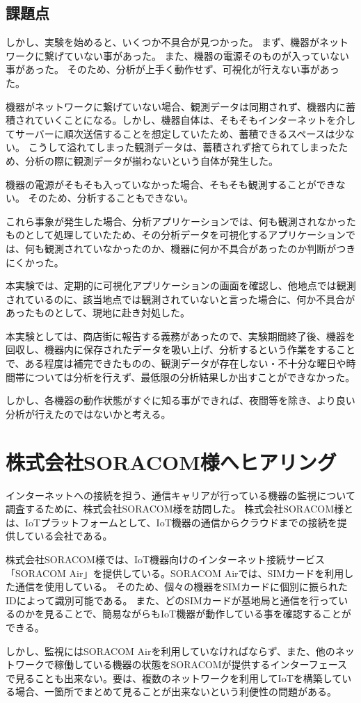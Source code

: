 \subsection{課題点}

しかし、実験を始めると、いくつか不具合が見つかった。
まず、機器がネットワークに繋げていない事があった。
また、機器の電源そのものが入っていない事があった。
そのため、分析が上手く動作せず、可視化が行えない事があった。

機器がネットワークに繋げていない場合、観測データは同期されず、機器内に蓄積されていくことになる。しかし、機器自体は、そもそもインターネットを介してサーバーに順次送信することを想定していたため、蓄積できるスペースは少ない。
こうして溢れてしまった観測データは、蓄積されず捨てられてしまったため、分析の際に観測データが揃わないという自体が発生した。

機器の電源がそもそも入っていなかった場合、そもそも観測することができない。
そのため、分析することもできない。

これら事象が発生した場合、分析アプリケーションでは、何も観測されなかったものとして処理していたため、その分析データを可視化するアプリケーションでは、何も観測されていなかったのか、機器に何か不具合があったのか判断がつきにくかった。

本実験では、定期的に可視化アプリケーションの画面を確認し、他地点では観測されているのに、該当地点では観測されていないと言った場合に、何か不具合があったものとして、現地に赴き対処した。

本実験としては、商店街に報告する義務があったので、実験期間終了後、機器を回収し、機器内に保存されたデータを吸い上げ、分析するという作業をすることで、ある程度は補完できたものの、観測データが存在しない・不十分な曜日や時間帯については分析を行えず、最低限の分析結果しか出すことができなかった。

しかし、各機器の動作状態がすぐに知る事ができれば、夜間等を除き、より良い分析が行えたのではないかと考える。




\section{株式会社SORACOM様へヒアリング}
インターネットへの接続を担う、通信キャリアが行っている機器の監視について調査するために、株式会社SORACOM様を訪問した。
株式会社SORACOM様とは、IoTプラットフォームとして、IoT機器の通信からクラウドまでの接続を提供している会社である。

株式会社SORACOM様では、IoT機器向けのインターネット接続サービス「SORACOM Air」を提供している。SORACOM Airでは、SIMカードを利用した通信を使用している。
そのため、個々の機器をSIMカードに個別に振られたIDによって識別可能である。
また、どのSIMカードが基地局と通信を行っているのかを見ることで、簡易ながらもIoT機器が動作している事を確認することができる。

しかし、監視にはSORACOM Airを利用していなければならず、また、他のネットワークで稼働している機器の状態をSORACOMが提供するインターフェースで見ることも出来ない。要は、複数のネットワークを利用してIoTを構築している場合、一箇所でまとめて見ることが出来ないという利便性の問題がある。


